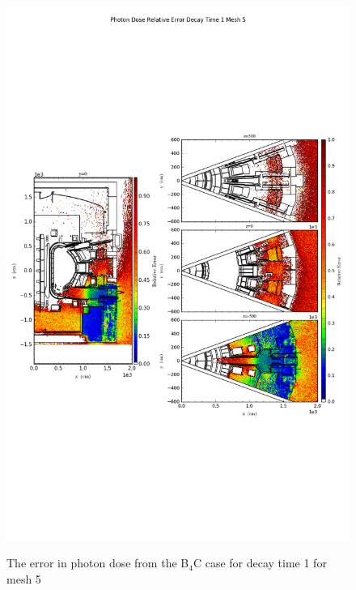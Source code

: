 \begin{figure}[ht!]
\centering
\includegraphics[trim={0cm 9cm 0cm 10cm},clip,scale=0.75]{../plots/final_model_with_b4c/Photon_Dose_Relative_Error_Decay_Time_1_Mesh_5.png}
\label{fig:photons_dc1_no4bc_m5_error}
\caption{The error in photon dose from the B$_4$C case for decay time 1 for mesh 5}
\end{figure}
